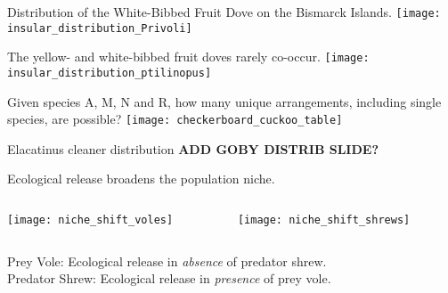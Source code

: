 \documentclass[xcolor=svgnames]{beamer}
\begin{document}
\begin{frame}{Distribution of the White-Bibbed Fruit Dove on the Bismarck Islands.}
	\centering
		\texttt{[image: insular\_distribution\_Privoli]}\\
\end{frame}

\begin{frame}{The yellow- and white-bibbed fruit doves rarely co-occur.}
	\centering
		\texttt{[image: insular\_distribution\_ptilinopus]}\\
\end{frame}

\begin{frame}{Given species A, M, N and R, how many unique arrangements, including single species, are possible?}
	\pause
	\centering
		\texttt{[image: checkerboard\_cuckoo\_table]}\\
\end{frame}

\begin{frame}{Elacatinus cleaner distribution}
\textbf{ADD GOBY DISTRIB SLIDE?}
\end{frame}

\begin{frame}{Ecological release broadens the population niche.}
	\begin{columns}[T]
		\begin{column}{0.5\textwidth}
		\centering
			\texttt{[image: niche\_shift\_voles]}\\
		\end{column}
		\begin{column}{0.5\textwidth}
		\centering
			\texttt{[image: niche\_shift\_shrews]}\\
		\end{column}
	\end{columns}
	\begin{block}{}
	Prey Vole: Ecological release in \textit{absence} of predator shrew.\\
	Predator Shrew: Ecological release in \textit{presence} of prey vole.
	\end{block}
\end{frame}
\end{document}
